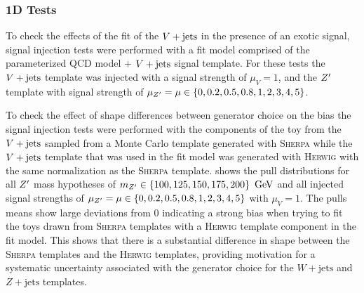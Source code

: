 \subsubsection{1D Tests}
To check the effects of the fit of the $V + \text{jets}$ in the presence of an exotic signal, signal injection tests were performed with a fit model comprised of the parameterized QCD model + $V + \text{jets}$ signal template.
For these tests the $V + \text{jets}$ template was injected with a signal strength of $\mu_{V} = 1$, and the $Z^{\prime}$ template with signal strength of $\mu_{Z^{\prime}} = \mu \in \left\{0, 0.2, 0.5, 0.8, 1, 2, 3, 4, 5\right\}$.

To check the effect of shape differences between generator choice on the bias the signal injection tests were performed with the components of the toy from the $V + \text{jets}$ sampled from a Monte Carlo template generated with \textsc{Sherpa} while the $V + \text{jets}$ template that was used in the fit model was generated with \textsc{Herwig} with the same normalization as the \textsc{Sherpa} template.
 shows the pull distributions for all $Z^{\prime}$ mass hypotheses of $m_{Z^{\prime}} \in \left\{100, 125, 150, 175, 200\right\}~\mathrm{GeV}$ and all injected signal strengths of $\mu_{Z^{\prime}} = \mu \in \left\{0, 0.2, 0.5, 0.8, 1, 2, 3, 4, 5\right\}$ with $\mu_{V} = 1$.
The pulls means show large deviations from $0$ indicating a strong bias when trying to fit the toys drawn from \textsc{Sherpa} templates with a \textsc{Herwig} template component in the fit model.
This shows that there is a substantial difference in shape between the \textsc{Sherpa} templates and the \textsc{Herwig} templates, providing motivation for a systematic uncertainty associated with the generator choice for the $W+\mathrm{jets}$ and $Z+\mathrm{jets}$ templates.

